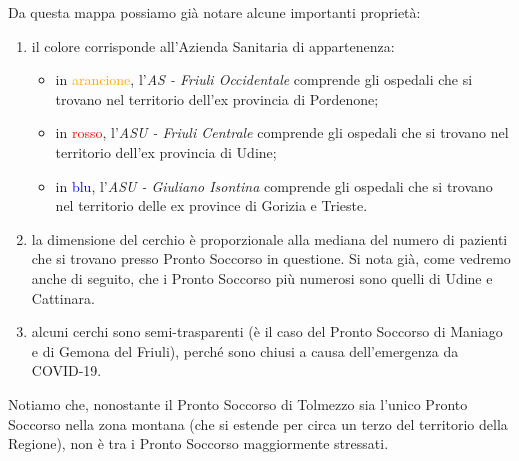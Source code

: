 \documentclass[8pt,english,aspectratio=169]{beamer}
\begin{document}
\begin{frame}
{Da questa mappa possiamo già notare alcune importanti proprietà:
\begin{enumerate}
	\item il colore corrisponde all'Azienda Sanitaria di appartenenza:
		\begin{itemize}
			\item in \textcolor{orange}{arancione}, l'\textit{AS - Friuli Occidentale} comprende gli ospedali che si trovano nel territorio dell'ex provincia di Pordenone;
			\item in \textcolor{red}{rosso}, l'\textit{ASU - Friuli Centrale} comprende gli ospedali che si trovano nel territorio dell'ex provincia di Udine;
			\item in \textcolor{blue}{blu}, l'\textit{ASU - Giuliano Isontina} comprende gli ospedali che si trovano nel territorio delle ex province di Gorizia e Trieste.
		\end{itemize}
	\item la dimensione del cerchio è proporzionale alla mediana del numero di pazienti che si trovano presso Pronto Soccorso in questione. Si nota già, come vedremo anche di seguito, che i Pronto Soccorso più numerosi sono quelli di Udine e Cattinara.
	\item alcuni cerchi sono semi-trasparenti (è il caso del Pronto Soccorso di Maniago e di Gemona del Friuli), perché sono chiusi a causa dell'emergenza da COVID-19.
\end{enumerate}
Notiamo che, nonostante il Pronto Soccorso di Tolmezzo sia l'unico Pronto Soccorso nella zona montana (che si estende per circa un terzo del territorio della Regione), non è tra i Pronto Soccorso maggiormente stressati.
}
\end{frame}
\end{document}
